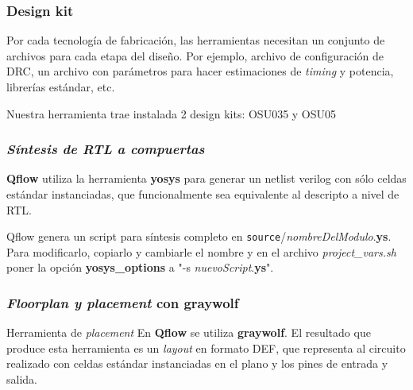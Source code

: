 \documentclass{beamer}
\begin{document}
\begin{frame}
\frametitle{Design kit}
Por cada tecnología de fabricación, las herramientas necesitan un conjunto de archivos para cada etapa del diseño. Por ejemplo, archivo de configuración de DRC, un archivo con parámetros para hacer estimaciones de  \emph{timing} y potencia, librerías estándar, etc.

Nuestra herramienta trae instalada 2 design kits: OSU035 y OSU05


\end{frame}
\begin{frame}[fragile]
  \frametitle{\emph{Síntesis de RTL a compuertas}}
  \textbf{Qflow} utiliza la herramienta \textbf{yosys} para generar un netlist verilog con sólo celdas estándar instanciadas, que funcionalmente sea equivalente al descripto a nivel de RTL.

  Qflow genera un script para síntesis completo en \verb.source./\emph{nombreDelModulo}.\textbf{ys}. Para modificarlo, copiarlo y cambiarle el nombre y en el archivo \emph{project\_vars.sh} poner la opción \textbf{yosys\_options} a "-s \emph{nuevoScript}.\textbf{ys}".

 
\end{frame}

\begin{frame}[fragile]
  \frametitle{\emph{Floorplan y placement} con \textbf{graywolf}}
  \begin{exampleblock}{Herramienta de \emph{placement}}
    En \textbf{Qflow} se utiliza \textbf{graywolf}. El resultado que produce esta herramienta es un \emph{layout} en formato DEF, que representa al circuito realizado con celdas estándar instanciadas en el plano y los pines de entrada y salida.
  \end{exampleblock}
\end{frame}
\end{document}
